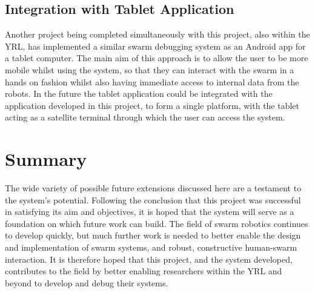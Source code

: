 
\subsection{Integration with Tablet Application}

Another project being completed simultaneously with this project, also within the YRL, has implemented a similar swarm debugging system as an Android app for a tablet computer. The main aim of this approach is to allow the user to be more mobile whilst using the system, so that they can interact with the swarm in a hands on fashion whilst also having immediate access to internal data from the robots. In the future the tablet application could be integrated with the application developed in this project, to form a single platform, with the tablet acting as a satellite terminal through which the user can access the system.


\section{Summary}

The wide variety of possible future extensions discussed here are a testament to the system's potential. Following the conclusion that this project was successful in satisfying its aim and objectives, it is hoped that the system will serve as a foundation on which future work can build. The field of swarm robotics continues to develop quickly, but much further work is needed to better enable the design and implementation of swarm systems, and robust, constructive human-swarm interaction. It is therefore hoped that this project, and the system developed, contributes to the field by better enabling researchers within the YRL and beyond to develop and debug their systems.

